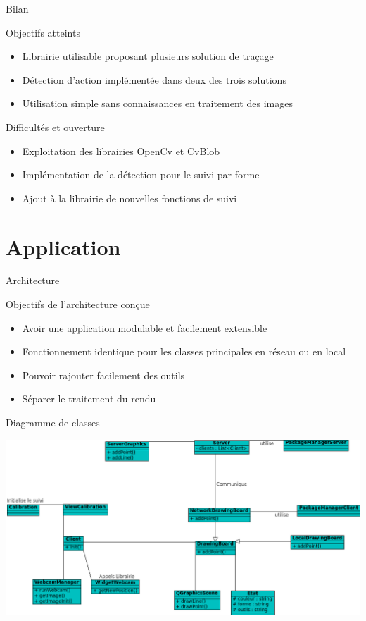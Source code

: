 \documentclass{beamer}
\begin{document}
		\begin{frame}{Bilan}
			\begin{exampleblock}{Objectifs atteints}
				\begin{itemize}
				\item Librairie utilisable proposant plusieurs solution de traçage
				\item Détection d'action implémentée dans deux des trois solutions
				\item Utilisation simple sans connaissances en traitement des images
				\end{itemize}
			\end{exampleblock}
			\pause
			\begin{alertblock}{Difficultés et ouverture}
				\begin{itemize}
				\item Exploitation des librairies OpenCv et CvBlob 
				\item Implémentation de la détection pour le suivi par forme
				\item Ajout à la librairie de nouvelles fonctions de suivi
				\end{itemize}
			\end{alertblock}
		\end{frame}
	
	\section{Application}
		\begin{frame}{Architecture}
			\begin{block}{Objectifs de l'architecture conçue}
				\begin{itemize}
				\item{Avoir une application modulable et facilement extensible}
				\item{Fonctionnement identique pour les classes principales en réseau ou en local}
				\item{Pouvoir rajouter facilement des outils}
				\item{Séparer le traitement du rendu}
				\end{itemize}
			\end{block}
		\end{frame}
		
		\begin{frame}{Diagramme de classes}
			\begin{center}		
			\includegraphics[scale=0.45]{../uml/classes.png}
			\end{center}
		\end{frame}
		
\end{document}

